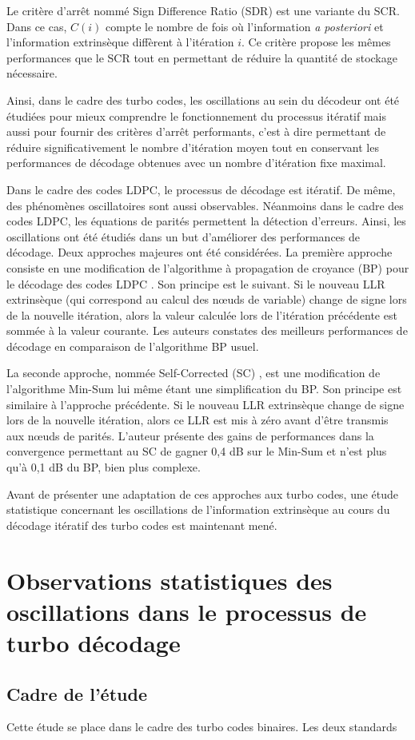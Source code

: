 Le critère d'arrêt nommé Sign Difference Ratio (SDR) \cite{fossorier_scr} est une variante du SCR. Dans ce cas, $C(i)$ 
compte le nombre de fois où l'information \textit{a posteriori} et l'information extrinsèque diffèrent à l'itération $i$. 
Ce critère propose les mêmes performances que le SCR tout en permettant de réduire la quantité de stockage nécessaire.

Ainsi, dans le cadre des turbo codes, les oscillations au sein du décodeur ont été étudiées pour mieux comprendre le 
fonctionnement du processus itératif mais aussi pour fournir des critères d'arrêt performants, c'est à dire permettant de 
réduire significativement le nombre d'itération moyen tout en conservant les performances de décodage obtenues avec un 
nombre d'itération fixe maximal.

Dans le cadre des codes LDPC, le processus de décodage est itératif. De même, des phénomènes oscillatoires sont aussi 
observables. Néanmoins dans le cadre des codes LDPC, les équations de parités permettent la détection d'erreurs. Ainsi, 
les oscillations ont été étudiés dans un but d'améliorer des performances de décodage. Deux approches majeures ont été 
considérées. La première approche consiste en une modification de l'algorithme à propagation de croyance (BP) pour le 
décodage des codes LDPC \cite{gounai_bp_osc}. Son principe est le suivant. Si le nouveau LLR extrinsèque (qui correspond 
au calcul des nœuds de variable) change de signe lors de la nouvelle itération, alors la valeur calculée lors de 
l'itération précédente est sommée à la valeur courante. Les auteurs constates des meilleurs performances de décodage en 
comparaison de l'algorithme BP usuel.

La seconde approche, nommée Self-Corrected (SC) \cite{savin_sc}, est une modification de l'algorithme Min-Sum lui même
étant une simplification du BP. Son principe est similaire à l'approche précédente. Si le nouveau LLR extrinsèque change 
de signe lors de la nouvelle itération, alors ce LLR est mis à zéro avant d'être transmis aux nœuds de parités. L'auteur 
présente des gains de performances dans la convergence permettant au SC de gagner 0,4 dB sur le Min-Sum et n'est plus 
qu'à 0,1 dB du BP, bien plus complexe.

Avant de présenter une adaptation de ces approches aux turbo codes, une étude statistique concernant les oscillations 
de l'information extrinsèque au cours du décodage itératif des turbo codes est maintenant mené.

\section{Observations statistiques des oscillations dans le processus de turbo décodage}

\subsection{Cadre de l'étude}
Cette étude se place dans le cadre des turbo codes binaires. Les deux standards 
